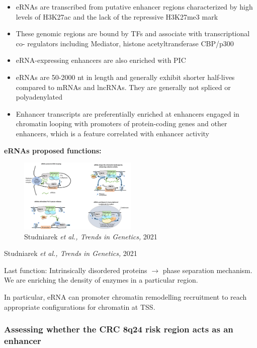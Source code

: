 \begin{itemize}
\tightlist
\item
  eRNAs are transcribed from putative enhancer regions characterized by high levels of H3K27ac and the lack of the repressive H3K27me3 mark
\item
  These genomic regions are bound by TFs and associate with transcriptional co- regulators including Mediator, histone acetyltransferase CBP/p300
\item
  eRNA-expressing enhancers are also enriched with PIC
\item
  eRNAs are 50-2000 nt in length and generally exhibit shorter half-lives compared to
  mRNAs and lncRNAs. They are generally not spliced or polyadenylated
\item
  Enhancer transcripts are preferentially enriched at enhancers engaged in chromatin looping with promoters of protein-coding genes and other enhancers, which is a feature correlated with enhancer activity
\end{itemize}

\textbf{eRNAs proposed functions:}

\begin{figure}
\centering
\includegraphics[width=0.5\textwidth]{../_resources/Screenshot_2022-10-12_at_10-00-02.png}
\caption{Studniarek \emph{et al., Trends in Genetics,} 2021}
\end{figure}

Studniarek \emph{et al., Trends in Genetics,} 2021

Last function: Intrinsically disordered proteins $\rightarrow$ phase separation mechanism. We are enriching the density of enzymes in a particular region.

In particular, eRNA can promoter chromatin remodelling recruitment to reach appropriate configurations for chromatin at TSS.

\hypertarget{assessing-whether-the-crc-8q24-risk-region-acts-as-an-enhancer}{%
\subsubsection{\texorpdfstring{\textbf{Assessing whether the CRC 8q24 risk region acts as an enhancer}}{Assessing whether the CRC 8q24 risk region acts as an enhancer}}\label{assessing-whether-the-crc-8q24-risk-region-acts-as-an-enhancer}}

